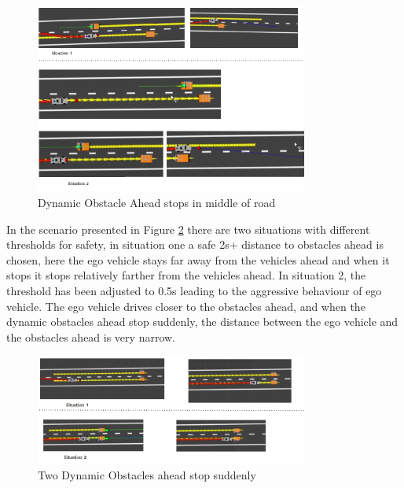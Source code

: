 \begin{figure}
    \centering
    \includegraphics[width=0.8\textwidth]{Images/evaluation/dynamic_ahead_breaking1.jpg}
    \caption{Dynamic Obstacle Ahead stops in middle of road}
    \label{dynamic_1}
\end{figure}

In the scenario presented in Figure \ref{dynamic_2} there are two situations with different thresholds for safety, in situation one a safe 2s+ distance to obstacles ahead is chosen, here the ego vehicle stays far away from the vehicles ahead and when it stops it stops relatively farther from the vehicles ahead. In situation 2, the threshold has been adjusted to 0.5s leading to the aggressive behaviour of ego vehicle. The ego vehicle drives closer to the obstacles ahead, and when the dynamic obstacles ahead stop suddenly, the distance between the ego vehicle and the obstacles ahead is very narrow.   
\begin{figure}
    \centering
    \includegraphics[width=0.8\textwidth]{Images/evaluation/dynamic_ahead_breaking2.jpg}
    \caption{Two Dynamic Obstacles ahead stop suddenly}
    \label{dynamic_2}
\end{figure}

